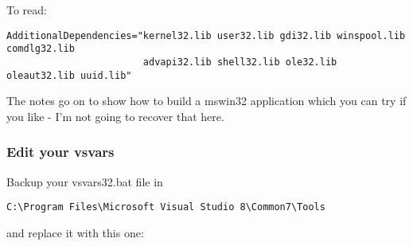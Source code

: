 To read:

\begin{verbatim}
AdditionalDependencies="kernel32.lib user32.lib gdi32.lib winspool.lib comdlg32.lib 
                        advapi32.lib shell32.lib ole32.lib oleaut32.lib uuid.lib"
\end{verbatim}

The notes go on to show how to build a mswin32 application which you can try if you like - 
I'm not going to recover that here.

\subsubsection{Edit your vsvars}
Backup your vsvars32.bat file in 

\begin{verbatim}
C:\Program Files\Microsoft Visual Studio 8\Common7\Tools
\end{verbatim}

and replace it with this one:

